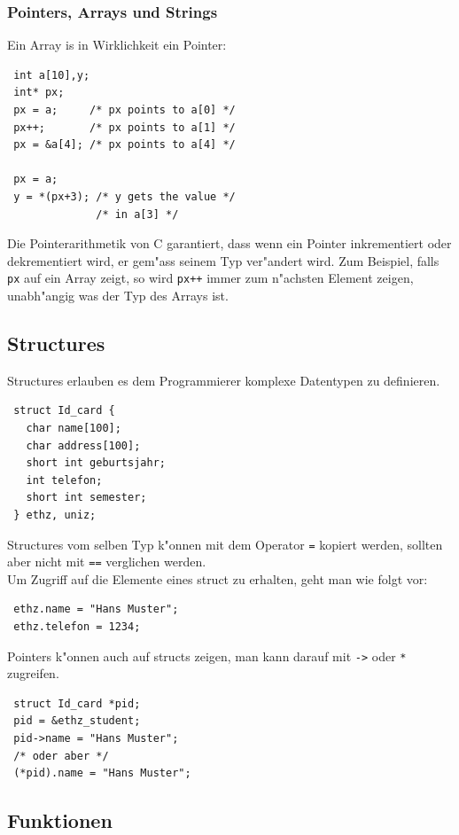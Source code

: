 \documentclass[german, 10pt, a4paper, twocolumn]{scrartcl}
\begin{document}
\subsubsection{Pointers, Arrays und Strings}

Ein Array is in Wirklichkeit ein Pointer:
\begin{verbatim}
 int a[10],y;
 int* px;
 px = a;     /* px points to a[0] */
 px++;       /* px points to a[1] */
 px = &a[4]; /* px points to a[4] */

 px = a;
 y = *(px+3); /* y gets the value */
              /* in a[3] */
\end{verbatim}

Die Pointerarithmetik von C garantiert, dass wenn ein Pointer inkrementiert oder dekrementiert wird, er gem"ass seinem Typ ver"andert wird. Zum Beispiel, falls \verb#px# auf ein Array zeigt, so wird \verb#px++# immer zum n"achsten Element zeigen, unabh"angig was der Typ des Arrays ist.

\subsection{Structures}

Structures erlauben es dem Programmierer komplexe Datentypen zu definieren.

\begin{verbatim}
 struct Id_card {
   char name[100];
   char address[100];
   short int geburtsjahr;
   int telefon;
   short int semester;
 } ethz, uniz;
\end{verbatim}

Structures vom selben Typ k"onnen mit dem Operator \verb#=# kopiert werden, sollten aber nicht mit \verb#==# verglichen werden.\\

Um Zugriff auf die Elemente eines struct zu erhalten, geht man wie folgt vor:
\begin{verbatim}
 ethz.name = "Hans Muster";
 ethz.telefon = 1234;
\end{verbatim}

Pointers k"onnen auch auf structs zeigen, man kann darauf mit \verb#-># oder \verb#*# zugreifen.
\begin{verbatim}
 struct Id_card *pid;
 pid = &ethz_student;
 pid->name = "Hans Muster";
 /* oder aber */
 (*pid).name = "Hans Muster";
\end{verbatim}

\subsection{Funktionen}
\end{document}
